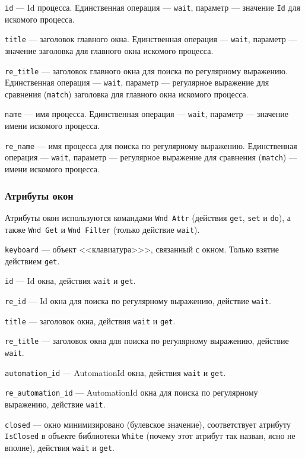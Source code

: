 \documentclass[11pt]{book} %
\begin{document}
\verb|id| --- Id процесса. Единственная операция --- \verb|wait|, параметр --- значение \verb"Id" для искомого процесса.

\verb|title| --- заголовок главного окна. Единственная операция --- \verb|wait|, параметр --- значение заголовка для главного окна искомого процесса.

\verb|re_title| --- заголовок главного окна для поиска по регулярному выражению. Единственная операция --- \verb|wait|, параметр --- регулярное выражение для сравнения (\verb|match|) заголовка для главного окна искомого процесса.

\verb|name| --- имя процесса. Единственная операция --- \verb|wait|, параметр --- значение имени искомого процесса.

\verb|re_name| --- имя процесса для поиска по регулярному выражению. Единственная операция --- \verb|wait|, параметр --- регулярное выражение для сравнения (\verb|match|) --- имени искомого процесса.
		



\subsubsection{Атрибуты окон}

Атрибуты окон используются командами \verb"Wnd Attr" (действия \verb|get|, \verb|set| и \verb|do|), а также \verb|Wnd Get| и \verb|Wnd Filter| (только действие \verb|wait|).

\verb|keyboard| --- объект <<клавиатура>>>, связанный с окном. Только взятие действием \verb|get|.

\verb'id' --- Id окна, действия \verb|wait| и \verb|get|.

\verb're_id' --- Id окна для поиска по регулярному выражению, действие \verb|wait|.

\verb'title' --- заголовок окна, действия \verb|wait| и \verb|get|.

\verb're_title' --- заголовок окна для поиска по регулярному выражению, действие \verb|wait|.

\verb'automation_id' --- AutomationId окна, действия \verb|wait| и \verb|get|.

\verb're_automation_id' --- AutomationId окна для поиска по регулярному выражению, действие \verb|wait|.


\verb'closed' --- окно минимизировано (булевское значение), соответствует атрибуту \verb|IsClosed| в объекте библиотеки \verb|White| (почему этот атрибут так назван, ясно не вполне), действия \verb|wait| и \verb|get|.
\end{document}
